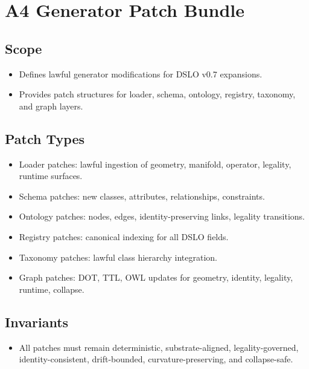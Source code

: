 \section{A4 Generator Patch Bundle}

\subsection{Scope}
\begin{itemize}
    \item Defines lawful generator modifications for DSLO v0.7 expansions.
    \item Provides patch structures for loader, schema, ontology, registry, taxonomy, and graph layers.
\end{itemize}

\subsection{Patch Types}
\begin{itemize}
    \item Loader patches: lawful ingestion of geometry, manifold, operator, legality, runtime surfaces.
    \item Schema patches: new classes, attributes, relationships, constraints.
    \item Ontology patches: nodes, edges, identity-preserving links, legality transitions.
    \item Registry patches: canonical indexing for all DSLO fields.
    \item Taxonomy patches: lawful class hierarchy integration.
    \item Graph patches: DOT, TTL, OWL updates for geometry, identity, legality, runtime, collapse.
\end{itemize}

\subsection{Invariants}
\begin{itemize}
    \item All patches must remain deterministic, substrate-aligned, legality-governed, identity-consistent, drift-bounded, curvature-preserving, and collapse-safe.
\end{itemize}
